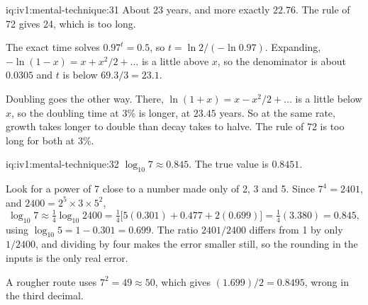 \begin{solution}{iq:iv1:mental-technique:31}
About 23 years, and more exactly $22.76$. The rule of 72 gives 24, which is too long.

The exact time solves $0.97^t = 0.5$, so $t = \ln 2 / (-\ln 0.97)$. Expanding, $-\ln(1 - x) = x + x^2/2 + \dots$ is a little above $x$, so the denominator is about $0.0305$ and $t$ is below $69.3/3 = 23.1$.

Doubling goes the other way. There, $\ln(1 + x) = x - x^2/2 + \dots$ is a little below $x$, so the doubling time at 3\% is longer, at $23.45$ years. So at the same rate, growth takes longer to double than decay takes to halve. The rule of 72 is too long for both at 3\%.

\end{solution}

\begin{solution}{iq:iv1:mental-technique:32}
$\log_{10} 7 \approx 0.845$. The true value is $0.8451$.

Look for a power of 7 close to a number made only of 2, 3 and 5. Since $7^4 = 2401$, and $2400 = 2^5 \times 3 \times 5^2$,
\[
\log_{10} 7 \approx \tfrac14 \log_{10} 2400 = \tfrac14 \bigl[ 5(0.301) + 0.477 + 2(0.699) \bigr] = \tfrac14 (3.380) = 0.845,
\]
using $\log_{10} 5 = 1 - 0.301 = 0.699$. The ratio $2401/2400$ differs from 1 by only $1/2400$, and dividing by four makes the error smaller still, so the rounding in the inputs is the only real error.

A rougher route uses $7^2 = 49 \approx 50$, which gives $(1.699)/2 = 0.8495$, wrong in the third decimal.

\end{solution}

